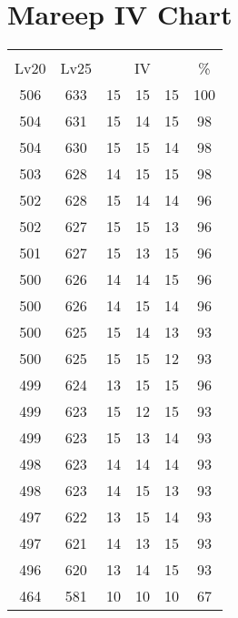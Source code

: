 \documentclass{article}%
\begin{document}
%
\normalsize%
\section{Mareep IV Chart}%
\label{sec:Mareep IV Chart}%
\renewcommand{\arraystretch}{1.5}%
\begin{tabular}{|c|c|c|c|c|c|}%
\hline%
\multicolumn{6}{|c|}{\textcolor{white}{ 
\linebreak{Mareep}
}%
\cellcolor{black}}\\%
\multicolumn{1}{|c}{Lv20}&\multicolumn{1}{c|}{Lv25}&\multicolumn{3}{c|}{IV}&\multicolumn{1}{|c|}{\%}\\%
\hline%
\rowcolor{color100}%
506&633&15&15&15&100\\%
\hline%
\rowcolor{color98}%
504&631&15&14&15&98\\%
\hline%
\rowcolor{color98}%
504&630&15&15&14&98\\%
\hline%
\rowcolor{color98}%
503&628&14&15&15&98\\%
\hline%
\rowcolor{color96}%
502&628&15&14&14&96\\%
\hline%
\rowcolor{color96}%
502&627&15&15&13&96\\%
\hline%
\rowcolor{color96}%
501&627&15&13&15&96\\%
\hline%
\rowcolor{color96}%
500&626&14&14&15&96\\%
\hline%
\rowcolor{color96}%
500&626&14&15&14&96\\%
\hline%
\rowcolor{color93}%
500&625&15&14&13&93\\%
\hline%
\rowcolor{color93}%
500&625&15&15&12&93\\%
\hline%
\rowcolor{color96}%
499&624&13&15&15&96\\%
\hline%
\rowcolor{color93}%
499&623&15&12&15&93\\%
\hline%
\rowcolor{color93}%
499&623&15&13&14&93\\%
\hline%
\rowcolor{color93}%
498&623&14&14&14&93\\%
\hline%
\rowcolor{color93}%
498&623&14&15&13&93\\%
\hline%
\rowcolor{color93}%
497&622&13&15&14&93\\%
\hline%
\rowcolor{color93}%
497&621&14&13&15&93\\%
\hline%
\rowcolor{color93}%
496&620&13&14&15&93\\%
\hline%
\rowcolor{color91}%
464&581&10&10&10&67\\%
\end{tabular}

%
\end{document}
